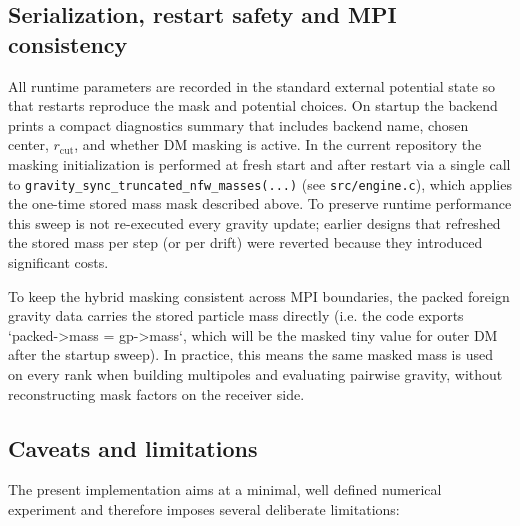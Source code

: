 
\subsection{Serialization, restart safety and MPI consistency}

All runtime parameters are recorded in the standard external potential state so that restarts reproduce the mask and potential choices. On startup the backend prints a compact diagnostics summary that includes backend name, chosen center, $r_{\mathrm{cut}}$, and whether DM masking is active. In the current repository the masking initialization is performed at fresh start and after restart via a single call to
\texttt{gravity\_sync\_truncated\_nfw\_masses(...)} (see \texttt{src/engine.c}), which applies the one-time stored mass mask described above. To preserve runtime performance this sweep is not re-executed every gravity update; earlier designs that refreshed the stored mass per step (or per drift) were reverted because they introduced significant costs.

To keep the hybrid masking consistent across MPI boundaries, the packed foreign gravity data carries the stored particle mass directly (i.e. the code exports `packed->mass = gp->mass`, which will be the masked tiny value for outer DM after the startup sweep). In practice, this means the same masked mass is used on every rank when building multipoles and evaluating pairwise gravity, without reconstructing mask factors on the receiver side.

\subsection{Caveats and limitations}

The present implementation aims at a minimal, well defined numerical experiment and therefore imposes several deliberate limitations:

